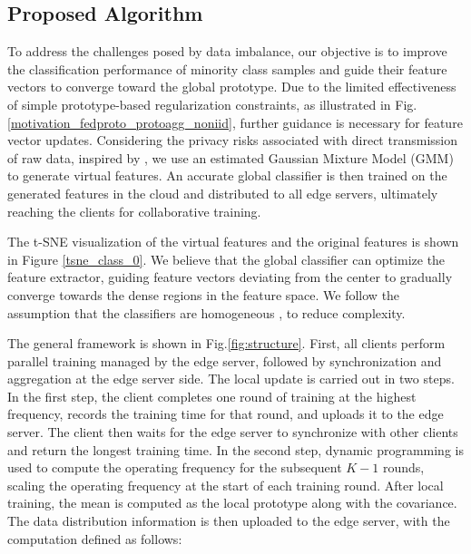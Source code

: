 \documentclass[journal]{IEEEtran}
\begin{document}
\subsection{Proposed Algorithm}
To address the challenges posed by data imbalance, our objective is to improve the classification performance of minority class samples and guide their feature vectors to converge toward the global prototype. Due to the limited effectiveness of simple prototype-based regularization constraints, as illustrated in Fig.\ref{motivation_fedproto_protoagg_noniid}, further guidance is necessary for feature vector updates. Considering the privacy risks associated with direct transmission of raw data, inspired by \cite{luo_no_2021}, we use an estimated Gaussian Mixture Model (GMM) to generate virtual features. An accurate global classifier is then trained on the generated features in the cloud and distributed to all edge servers, ultimately reaching the clients for collaborative training.

The t-SNE visualization of the virtual features and the original features is shown in Figure \ref{tsne_class_0}. We believe that the global classifier can optimize the feature extractor, guiding feature vectors deviating from the center to gradually converge towards the dense regions in the feature space. We follow the assumption that the classifiers are homogeneous \cite{tan_fedproto_2021,zhang_fedtgp_2024}, to reduce complexity.


The general framework is shown in Fig.\ref{fig:structure}. First, all clients perform parallel training managed by the edge server, followed by synchronization and aggregation at the edge server side. The local update is carried out in two steps. In the first step, the client completes one round of training at the highest frequency, records the training time for that round, and uploads it to the edge server. The client then waits for the edge server to synchronize with other clients and return the longest training time. In the second step, dynamic programming is used to compute the operating frequency for the subsequent $K-1$ rounds, scaling the operating frequency at the start of each training round. After local training, the mean is computed as the local prototype along with the covariance. The data distribution information is then uploaded to the edge server, with the computation defined as follows:
\end{document}
